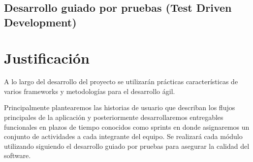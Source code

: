\subsection{Desarrollo guiado por pruebas (Test Driven Development)}


\section{Justificación}

A lo largo del desarrollo del proyecto se utilizarán prácticas características de varios frameworks y metodologías para el desarrollo ágil.

Principalmente plantearemos las historias de usuario que describan los flujos principales de la aplicación y posteriormente desarrollaremos entregables funcionales en plazos de tiempo conocidos como sprints en donde asignaremos un conjunto de actividades a cada integrante del equipo. Se realizará cada módulo utilizando siguiendo el desarrollo guiado por pruebas para asegurar la calidad del software. 


